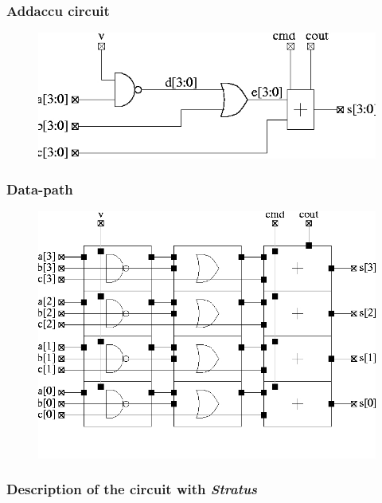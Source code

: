\subsubsection{Addaccu circuit}

\begin{figure}[h!]
\centering
\includegraphics[width=.9\textwidth]{images/add1.png}
\end{figure}
  
\newpage

\subsubsection{Data-path}

\begin{figure}[h!]
\centering
\includegraphics[width=.9\textwidth]{images/add2.png}
\end{figure}

\subsubsection{Description of the circuit with \emph{Stratus}}

